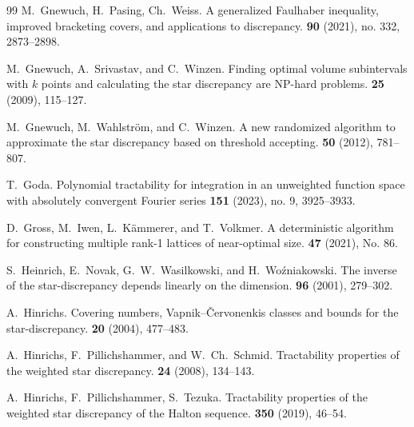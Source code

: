 \documentclass[12pt]{article}
\theoremstyle{definition}
\numberwithin{equation}{section}
\begin{document}
\begin{thebibliography}{99}
M.~Gnewuch, H.~Pasing, Ch.~Weiss. 
\newblock A generalized Faulhaber inequality, improved bracketing covers, and applications to discrepancy. 
 \textbf{90} (2021), no. 332, 2873--2898. 

M.~Gnewuch, A.~Srivastav, and C.~Winzen.
\newblock Finding optimal volume subintervals with $k$ points and calculating the star discrepancy are NP-hard problems.
 \textbf{25} (2009), 115--127.

M.~Gnewuch, M.~Wahlstr\"om, and C.~Winzen.
\newblock A new randomized algorithm to approximate the star discrepancy based on threshold accepting.
 \textbf{50} (2012), 781--807.

T.~Goda.
\newblock Polynomial tractability for integration in an unweighted function space with absolutely convergent Fourier series
 \textbf{151} (2023), no. 9, 3925--3933.

D.~Gross, M.~Iwen, L.~K\"ammerer, and T.~Volkmer.
\newblock A deterministic algorithm for constructing multiple rank-1 lattices of near-optimal size.
 \textbf{47} (2021), No. 86.


S.~Heinrich, E.~Novak, G.~W.~Wasilkowski, and H.~Wo\'zniakowski.
\newblock The inverse of the star-discrepancy depends linearly on the dimension.
 \textbf{96} (2001), 279--302.

A.~Hinrichs.
\newblock Covering numbers, Vapnik--{\v C}ervonenkis classes and bounds for the star-discrepancy.
 \textbf{20} (2004), 477--483.


A.~Hinrichs, F.~Pillichshammer, and W.~Ch.~Schmid.
\newblock Tractability properties of the weighted star discrepancy.
 \textbf{24} (2008), 134--143.


A.~Hinrichs, F.~Pillichshammer, S.~Tezuka.
\newblock Tractability properties of the weighted star discrepancy of the Halton sequence.
 \textbf{350} (2019), 46--54.




\end{thebibliography}
\end{document}
